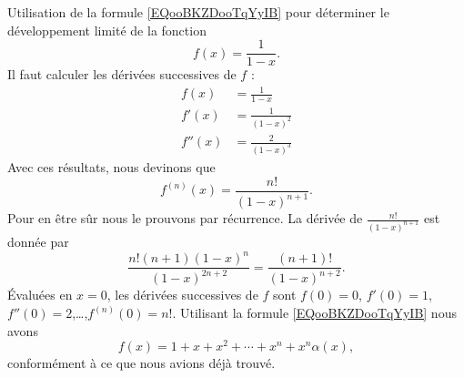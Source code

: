 \begin{example}
	Utilisation de la formule \eqref{EQooBKZDooTqYyIB} pour déterminer le développement limité de la fonction
	\begin{equation}
		f(x)=\frac{1}{ 1-x }.
	\end{equation}
	Il faut calculer les dérivées successives de \( f\) :
	\begin{subequations}
		\begin{align}
			f(x)   & =\frac{1}{ 1-x }       \\
			f'(x)  & =\frac{ 1 }{ (1-x)^2 } \\
			f''(x) & =\frac{ 2 }{ (1-x)^3 }
		\end{align}
	\end{subequations}
	Avec ces résultats, nous devinons que
	\begin{equation}
		f^{(n)}(x)=\frac{ n! }{ (1-x)^{n+1} }.
	\end{equation}
	Pour en être sûr nous le prouvons par récurrence. La dérivée de \(\frac{ n! }{ (1-x)^{n+1} } \) est donnée par
	\begin{equation}
		\frac{ n!(n+1)(1-x)^n }{ (1-x)^{2n+2} }=\frac{(n+1)! }{ (1-x)^{n+2} }.
	\end{equation}
	Évaluées en \( x=0\), les dérivées successives de \( f\) sont \( f(0)=0\), \( f'(0)=1\), \( f''(0)=2\),\ldots,\( f^{(n)}(0)=n!\). Utilisant la formule \eqref{EQooBKZDooTqYyIB} nous avons
	\begin{equation}
		f(x)=1+x+x^2+\cdots +x^n+x^n\alpha(x),
	\end{equation}
	conformément à ce que nous avions déjà trouvé.
\end{example}

